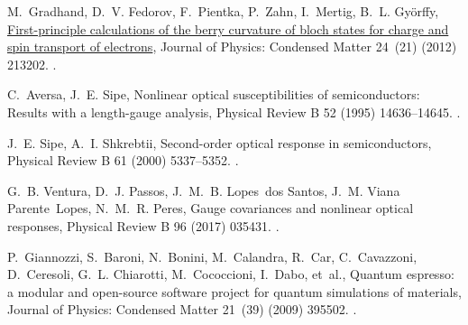 \documentclass[a4paper,12pt]{report}
\begin{document}

\begin{thebibliography}{00}

M.~Gradhand, D.~V. Fedorov, F.~Pientka, P.~Zahn, I.~Mertig, B.~L. Györffy,
  \href{https://dx.doi.org/10.1088/0953-8984/24/21/213202}{First-principle
  calculations of the berry curvature of bloch states for charge and spin
  transport of electrons}, Journal of Physics: Condensed Matter 24~(21) (2012)
  213202.
\newblock \href {https://doi.org/10.1088/0953-8984/24/21/213202}
  {}.


C.~Aversa, J.~E. Sipe, Nonlinear optical susceptibilities of semiconductors:
  Results with a length-gauge analysis, Physical Review B 52 (1995)
  14636--14645.
\newblock \href {https://doi.org/10.1103/PhysRevB.52.14636}
  {}.

J.~E. Sipe, A.~I. Shkrebtii, Second-order optical response in semiconductors,
  Physical Review B 61 (2000) 5337--5352.
\newblock \href {https://doi.org/10.1103/PhysRevB.61.5337}
  {}.

G.~B. Ventura, D.~J. Passos, J.~M.~B. Lopes~dos Santos, J.~M. Viana
  Parente~Lopes, N.~M.~R. Peres, Gauge covariances and nonlinear optical
  responses, Physical Review B 96 (2017) 035431.
\newblock \href {https://doi.org/10.1103/PhysRevB.96.035431}
  {}.

P.~Giannozzi, S.~Baroni, N.~Bonini, M.~Calandra, R.~Car, C.~Cavazzoni,
  D.~Ceresoli, G.~L. Chiarotti, M.~Cococcioni, I.~Dabo, et~al., Quantum
  espresso: a modular and open-source software project for quantum simulations
  of materials, Journal of Physics: Condensed Matter 21~(39) (2009) 395502.
\newblock \href {https://doi.org/10.1088/0953-8984/21/39/395502}
  {}.


\end{thebibliography}
\end{document}
